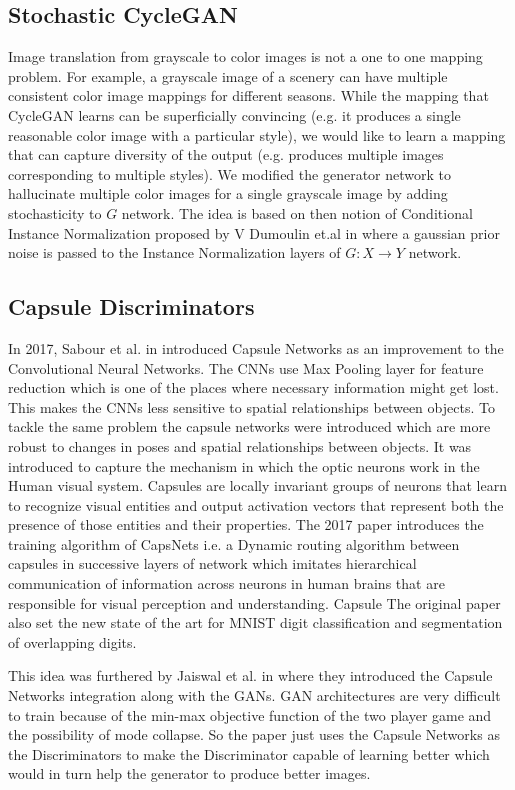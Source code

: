 \documentclass{article} %
\begin{document}
\subsection{Stochastic CycleGAN}
Image translation from grayscale to color images is not a one to one mapping problem. For example, a grayscale image of a scenery can have multiple consistent color image mappings for different seasons. While the mapping that CycleGAN learns can be superficially convincing (e.g. it produces a single reasonable color image with a particular style), we would like to learn a mapping that can capture diversity of the output (e.g. produces multiple images corresponding to multiple styles). We modified the generator network to hallucinate multiple color images for a single grayscale image by adding stochasticity to $G$ network. The idea is based on then notion of Conditional Instance Normalization proposed by V Dumoulin et.al in \cite{cond_norm} where a gaussian prior noise is passed to the Instance Normalization layers of $G : X \rightarrow Y$ network.

\subsection{Capsule Discriminators}

In 2017, Sabour et al. in \cite{capsnet} introduced Capsule Networks as an improvement to the Convolutional Neural Networks. The CNNs use Max Pooling layer for feature reduction which is one of the places where necessary information might get lost. This makes the CNNs less sensitive to spatial relationships between objects. To tackle the same problem the capsule networks were introduced which are more robust to changes in poses and spatial relationships between objects. It was introduced to capture the mechanism in which the optic neurons work in the Human visual system. Capsules are locally invariant groups of neurons that learn to recognize visual entities and output activation vectors that represent both the presence of those entities and their properties. The 2017 paper introduces the training algorithm of CapsNets i.e. a Dynamic routing algorithm between capsules in successive layers of network which imitates hierarchical communication of information across neurons in human brains that are responsible for visual perception and understanding. Capsule The original paper also set the new state of the art for MNIST digit classification and segmentation of overlapping digits. 

This idea was furthered by  Jaiswal et al. in \cite{capsuleGan} where they introduced the Capsule Networks integration along with the GANs. GAN architectures are very difficult to train because of the min-max objective function of the two player game and the possibility of mode collapse. So the paper just uses the Capsule Networks as the Discriminators to make the Discriminator capable of learning better which would in turn help the generator to produce better images. 
\end{document}
